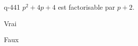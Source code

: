 \begin{truefalse}{q-441}
$p^2+4p+4$ est factorisable par $p+2$.
\item* Vrai
\item Faux
\end{truefalse}

